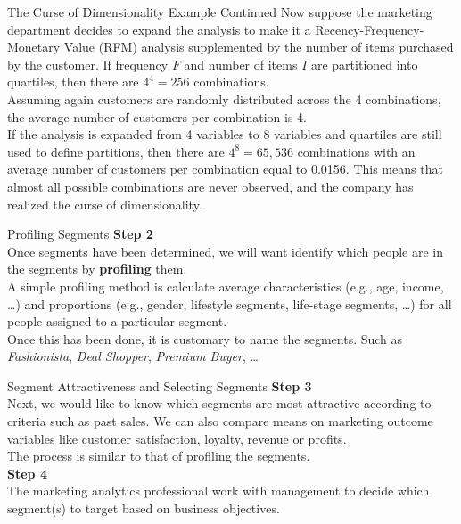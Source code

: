 \documentclass[pdf]{beamer}
\newcommand{\empr}[1]{{\color{franklinblue}\textbf{#1}}}
\theoremstyle{remark}
\theoremstyle{definition}
\begin{document}
\begin{frame}[t]{The Curse of Dimensionality Example Continued}
Now suppose the marketing department decides to expand the analysis to make it a Recency-Frequency-Monetary Value (RFM) analysis supplemented by the number of items purchased by the customer.  If frequency $F$ and number of items $I$ are partitioned into quartiles, then there are $4^4 = 256$ combinations. \\
\vspace{1.5ex} 
Assuming again customers are randomly distributed across the 4 combinations, the average number of customers per combination is 4. \\
\vspace{1.5ex}
If the analysis is expanded from 4 variables to 8 variables and quartiles are still used to define partitions, then there are $4^8 = 65,536$ combinations with an average number of customers per combination equal to 0.0156.  This means that almost all possible combinations are never observed, and the company has realized the curse of dimensionality.
\end{frame}

\begin{frame}[t]{Profiling Segments}
\textbf{\color{franklinblue} Step 2} \\
\vspace{1.5ex}
Once segments have been determined, we will want identify which people are in the segments by \empr{profiling} them.   \\
\vspace{1.5ex}
A simple profiling method is calculate average characteristics (e.g., age, income, \ldots)  and proportions (e.g., gender, lifestyle segments, life-stage segments, \ldots)  for all people assigned to a particular segment.  \\
\vspace{1.5ex}
Once this has been done, it is customary to name the segments.  Such as \textit{Fashionista}, \textit{Deal Shopper}, \textit{Premium Buyer}, \dots
\end{frame}

\begin{frame}[t]{Segment Attractiveness and Selecting Segments}
\textbf{\color{cardinalred} Step 3} \\
\vspace{1.5ex}
Next, we would like to know which segments are most attractive according to criteria such as past sales. We can also compare means on marketing outcome variables like customer satisfaction, loyalty, revenue or profits. \\
\vspace{1.5ex}
The process is similar to that of profiling the segments.\\
\vspace{1.5ex}
\textbf{\color{cardinalred} Step 4} \\
\vspace{1.5ex}
The marketing analytics professional work with management to decide which segment(s) to target based on business objectives.
\end{frame}
\end{document}
